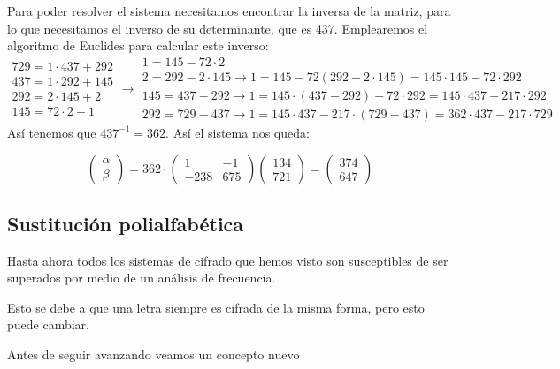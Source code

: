 \begin{example}
Para poder resolver el sistema necesitamos encontrar la inversa de la matriz, para lo que necesitamos el inverso de su determinante, que es 437. Emplearemos el algoritmo de Euclides para calcular este inverso:
\small
\[\begin{array}{l}
729 = 1 \cdot 437 + 292\\
437 = 1 \cdot 292 + 145 \\
292 = 2 \cdot 145 + 2 \\
145 = 72 \cdot 2 + 1
\end{array} \rightarrow \begin{array}{l}
1 = 145 - 72 \cdot 2\\
2 = 292 -2 \cdot 145 \to 1 = 145 - 72 (292 - 2 \cdot 145) = 145 \cdot 145 - 72 \cdot 292\\
145 = 437 - 292 \to 1 = 145 \cdot (437 - 292) - 72 \cdot 292 = 145 \cdot 437 - 217 \cdot 292\\
292 = 729 - 437 \to 1 = 145 \cdot 437 - 217 \cdot (729 - 437) = 362 \cdot 437 - 217 \cdot 729
\end{array}\]
\normalsize
Así tenemos que $437^{-1} = 362$. Así el sistema nos queda:

\[\left( \begin{array}{c}
α \\
β  \end{array} \right) = 362 \cdot \left( \begin{array}{cc}
1 & -1 \\
-238 & 675  \end{array} \right)\left( \begin{array}{c}
134\\
721  \end{array} \right) = \left( \begin{array}{c}
374 \\
647  \end{array} \right) \]
\end{example}

\subsection{Sustitución polialfabética}

Hasta ahora todos los sistemas de cifrado que hemos visto son susceptibles de ser superados por medio de un análisis de frecuencia.

Esto se debe a que una letra siempre es cifrada de la misma forma, pero esto puede cambiar.

Antes de seguir avanzando veamos un concepto nuevo

